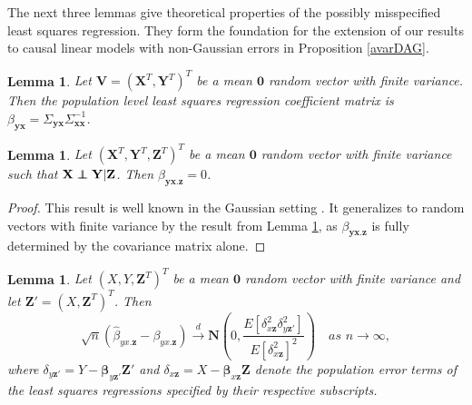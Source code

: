 \documentclass[11pt,a4paper]{article}
\newtheorem{Lemma}[Satz]{Lemma}
\theoremstyle{definition}
\theoremstyle{remark}
\newcommand\ci{\protect\mathpalette{\protect\independenT}{\perp}}
\def\independenT#1#2{\mathrel{\rlap{$#1#2$}\mkern2mu{#1#2}}}
\begin{document}
The next three lemmas give theoretical properties of the possibly misspecified least squares regression. They form the foundation for the extension of our results to causal linear models with non-Gaussian errors in Proposition \ref{avarDAG}.

\begin{Lemma} \citep[Cf. Section 3.1 of][]{buja2014models}
	Let $\mathbf{V} = (\mathbf{X}^T,\mathbf{Y}^T)^T$ be a mean $\mathbf{0}$ random vector with finite variance. Then the population level least squares regression coefficient matrix is $\beta_{\mathbf{yx}} = \Sigma_{\mathbf{yx}} \Sigma^{-1}_{\mathbf{xx}}$. 
	\label{lemma: buja}
\end{Lemma}


\begin{Lemma}
	Let $(\mathbf{X}^T,\mathbf{Y}^T,\mathbf{Z}^T)^T$ be a mean $\mathbf{0}$ random vector with finite variance such that $\mathbf{X} \ci \mathbf{Y} | \mathbf{Z}$. Then $\beta_{\mathbf{yx}.\mathbf{z}} = 0$.
	\label{lemma: independence}
\end{Lemma}

\begin{proof}
	This result is well known in the Gaussian setting \citep[cf. Section 2.5 of][]{anderson1958introduction}. It generalizes to random vectors with finite variance by the result from Lemma \ref{lemma: buja}, as $\beta_{\mathbf{yx}.\mathbf{z}} $ is fully determined by the covariance matrix alone.
\end{proof}

\begin{Lemma}{\cite[Cf. Corollary 11.1 of][]{buja2014models}}
	Let $(X,Y,\mathbf{Z}^T)^T$ be a mean $\mathbf{0}$ random vector with  finite variance and let $\mathbf{Z'} = (X,\mathbf{Z}^T)^T$. Then
	\[
	\sqrt{n}(\hat{\beta}_{yx.\mathbf{z}} - \beta_{yx.\mathbf{z}}) \xrightarrow{d} 
	\mathbf{N}\left(0,\frac{E[\delta^2_{x\mathbf{z}} \delta^2_{y\mathbf{z'}}]}{E[\delta^2_{x\mathbf{z}}]^2}\right) \quad \textit{as } n \rightarrow \infty,
	\] 
	where $\delta_{y\mathbf{z'}} = Y - \boldsymbol{\beta}_{y\mathbf{z'}}\mathbf{Z'}$ and $\delta_{x\mathbf{z}} = X - \boldsymbol{\beta}_{x\mathbf{z}}\mathbf{Z}$ denote the population error terms of the least squares regressions specified by their respective subscripts.
	\label{buja}
\end{Lemma}
\end{document}
